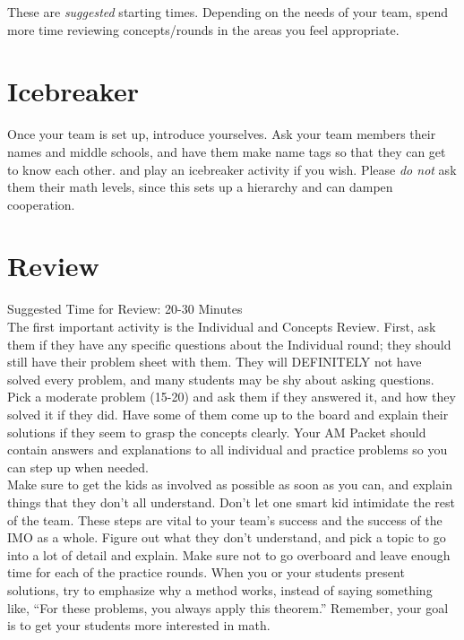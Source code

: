 \documentclass[11pt]{article}
\begin{document}
\begin{small}
\noindent *These are \textit{suggested} starting times.  Depending on the needs of your team, spend more time reviewing concepts/rounds in the areas you feel appropriate.

\section{Icebreaker}

Once your team is set up, introduce yourselves. Ask your team members their names and middle schools, and have them make name tags so that they can get to know each other. and play an icebreaker activity if you wish. Please \emph{do not} ask them their math levels, since this sets up a hierarchy and can dampen cooperation.
\begin{comment}
After introductions, we recommend that you run through the included icebreaker. There are seven icebreaker problems in your packet. Tape one to the back of each student (if you have fewer than seven students, it doesn't matter which problems you leave out). Make sure that each team member does not look at the problem on his/her own back! Ask them to line up in the order of the answer to the problem on their backs, i.e. so that the answer on any student's left is less than the student's answer, and that the answer on any student's right is greater than the student's answer. If you see students struggling with a problem, step in to help! The icebreaker is not a competition.
\end{comment}

\section{Review}
Suggested Time for Review: 20-30 Minutes \\
\noindent The first important activity is the Individual and Concepts Review.  First, ask them if they have any specific questions about the Individual round; they should still have their problem sheet with them.  They will DEFINITELY not have solved every problem, and many students may be shy about asking questions.  Pick a moderate problem (15-20) and ask them if they answered it, and how they solved it if they did.  Have some of them come up to the board and explain their solutions if they seem to grasp the concepts clearly.  Your AM Packet should contain answers and explanations to all individual and practice problems so you can step up when needed.  \\
\indent Make sure to get the kids as involved as possible as soon as you can, and explain things that they don't all understand. Don't let one smart kid intimidate the rest of the team. These steps are vital to your team's success and the success of the IMO as a whole.  Figure out what they don't understand, and pick a topic to go into a lot of detail and explain. Make sure not to go overboard and leave enough time for each of the practice rounds.
\indent When you or your students present solutions, try to emphasize why a method works, instead of saying something like, ``For these problems, you always apply this theorem.'' Remember, your goal is to get your students more interested in math.


\end{small}
\end{document}
